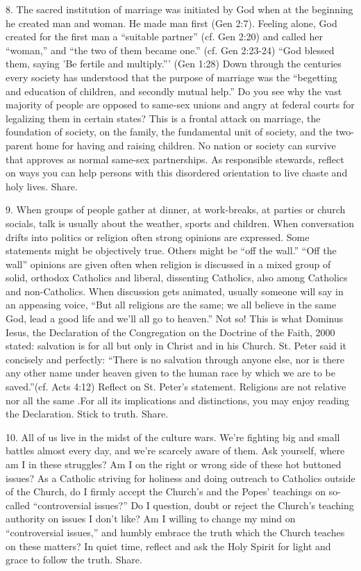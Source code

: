 \documentclass[oneside]{book}
\begin{document}
8. The sacred institution of marriage was initiated by God when at the beginning
he created man and woman. He made man first (Gen 2:7). Feeling alone, God
created for the first man a ``suitable partner'' (cf. Gen 2:20) and called her
``woman,'' and ``the two of them became one.'' (cf. Gen 2:23-24) ``God blessed
them, saying 'Be fertile and multiply.''' (Gen 1:28) Down through the centuries
every society has understood that the purpose of marriage was the ``begetting
and education of children, and secondly mutual help.'' Do you see why the vast
majority of people are opposed to same-sex unions and angry at federal courts
for legalizing them in certain states? This is a frontal attack on marriage, the
foundation of society, on the family, the fundamental unit of society, and the
two-parent home for having and raising children. No nation or society can
survive that approves as normal same-sex partnerships. As responsible stewards,
reflect on ways you can help persons with this disordered orientation to live
chaste and holy lives. Share.

9. When groups of people gather at dinner, at work-breaks, at parties or church
socials, talk is usually about the weather, sports and children. When
conversation drifts into politics or religion often strong opinions are
expressed. Some statements might be objectively true. Others might be ``off the
wall.'' ``Off the wall'' opinions are given often when religion is discussed in
a mixed group of solid, orthodox Catholics and liberal, dissenting Catholics,
also among Catholics and non-Catholics. When discussion gets animated, usually
someone will say in an appeasing voice, ``But all religions are the same; we all
believe in the same God, lead a good life and we'll all go to heaven.''
Not so! This is what Dominus Iesus, the Declaration of the Congregation on the
Doctrine of the Faith, 2000 stated: salvation is for all but only in Christ and
in his Church. St. Peter said it concisely and perfectly: ``There is no
salvation through anyone else, nor is there any other name under heaven given to
the human race by which we are to be saved.''(cf. Acts 4:12) Reflect on
St. Peter's statement. Religions are not relative nor all the same .For all its
implications and distinctions, you may enjoy reading the Declaration. Stick to
truth. Share.

10. All of us live in the midst of the culture wars. We're fighting big and
small battles almost every day, and we're scarcely aware of them. Ask yourself,
where am I in these struggles? Am I on the right or wrong side of these hot
buttoned issues? As a Catholic striving for holiness and doing outreach to
Catholics outside of the Church, do I firmly accept the Church's and the Popes'
teachings on so-called ``controversial issues?'' Do I question, doubt or reject
the Church's teaching authority on issues I don't like? Am I willing to change
my mind on ``controversial issues,'' and humbly embrace the truth which the
Church teaches on these matters? In quiet time, reflect and ask the Holy Spirit
for light and grace to follow the truth. Share.
\end{document}
